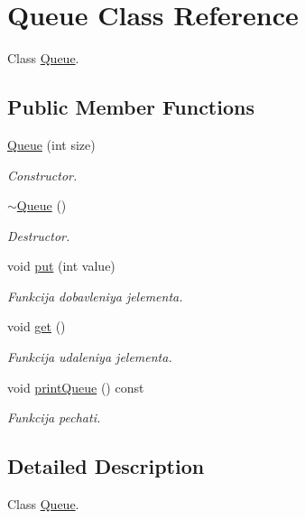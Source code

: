 \hypertarget{class_queue}{}\section{Queue Class Reference}
\label{class_queue}


Class \hyperlink{class_queue}{Queue}.  


\subsection*{Public Member Functions}
\begin{DoxyCompactItemize}
\item 
\hyperlink{class_queue_a700a33f52783f25b9ebd25d67ffb504a}{Queue} (int size)
\begin{DoxyCompactList}\small\item\em Constructor. \end{DoxyCompactList}\item 
\hyperlink{class_queue_a00d119db8fa3050da37746e82cbcf94f}{$\sim$\+Queue} ()
\begin{DoxyCompactList}\small\item\em Destructor. \end{DoxyCompactList}\item 
void \hyperlink{class_queue_ae74bd0e02d0606a68d8558ed367bb22e}{put} (int value)
\begin{DoxyCompactList}\small\item\em Funkcija dobavleniya jelementa. \end{DoxyCompactList}\item 
void \hyperlink{class_queue_a5c9b76732080f1c28f556a7dd4850eaa}{get} ()
\begin{DoxyCompactList}\small\item\em Funkcija udaleniya jelementa. \end{DoxyCompactList}\item 
void \hyperlink{class_queue_a7f08d471d7fa96aaa995c150c90f79c8}{print\+Queue} () const 
\begin{DoxyCompactList}\small\item\em Funkcija pechati. \end{DoxyCompactList}\end{DoxyCompactItemize}


\subsection{Detailed Description}
Class \hyperlink{class_queue}{Queue}. 

